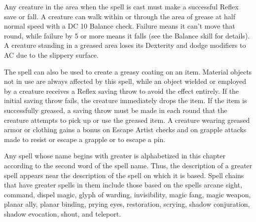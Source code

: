 \spellrng{\rngclose}
\begin{spelleffect}
  Any creature in the area when the spell is cast must make a successful Reflex save or fall. A creature can walk within or through the area of grease at half normal speed with a DC 10 Balance check. Failure means it can't move that round, while failure by 5 or more means it falls (see the Balance skill for details). A creature standing in a greased area loses its Dexterity and dodge modifiers to AC due to the slippery surface.
  \par The spell can also be used to create a greasy coating on an item. Material objects not in use are always affected by this spell, while an object wielded or employed by a creature receives a Reflex saving throw to avoid the effect entirely. If the initial saving throw fails, the creature immediately drops the item. If the item is successfully greased, a saving throw must be made in each round that the creature attempts to pick up or use the greased item. A creature wearing greased armor or clothing gains a  bonus on Escape Artist checks and on grapple attacks made to resist or escape a grapple or to escape a pin.
\end{spelleffect}

\par Any spell whose name begins with greater is alphabetized in this chapter according to the second word of the spell name. Thus, the description of a greater spell appears near the description of the spell on which it is based. Spell chains that have greater spells in them include those based on the spells arcane sight, command, dispel magic, glyph of warding, invisibility, magic fang, magic weapon, planar ally, planar binding, prying eyes, restoration, scrying, shadow conjuration, shadow evocation, shout, and teleport.


